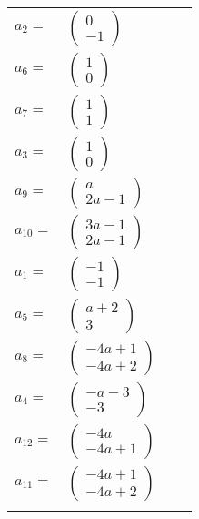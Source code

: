 \documentclass[1p]{elsarticle_modified}
\theoremstyle{definition}
\begin{document}
\begin{tabular}{m{7pt} m{180pt} m{7pt} m{180pt} }
\flushright $a_{2}=$&$\begin{pmatrix}0\\-1\end{pmatrix}$ \\
\flushright $a_{6}=$&$\begin{pmatrix}1\\0\end{pmatrix}$ \\
\flushright $a_{7}=$&$\begin{pmatrix}1\\1\end{pmatrix}$ \\
\flushright $a_{3}=$&$\begin{pmatrix}1\\0\end{pmatrix}$ \\
\flushright $a_{9}=$&$\begin{pmatrix}a\\2 a-1\end{pmatrix}$ \\
\flushright $a_{10}=$&$\begin{pmatrix}3 a-1\\2 a-1\end{pmatrix}$ \\
\flushright $a_{1}=$&$\begin{pmatrix}-1\\-1\end{pmatrix}$ \\
\flushright $a_{5}=$&$\begin{pmatrix}a+2\\3\end{pmatrix}$ \\
\flushright $a_{8}=$&$\begin{pmatrix}-4 a+1\\-4 a+2\end{pmatrix}$ \\
\flushright $a_{4}=$&$\begin{pmatrix}- a-3\\-3\end{pmatrix}$ \\
\flushright $a_{12}=$&$\begin{pmatrix}-4 a\\-4 a+1\end{pmatrix}$ \\
\flushright $a_{11}=$&$\begin{pmatrix}-4 a+1\\-4 a+2\end{pmatrix}$\\&\end{tabular}
\end{document}
